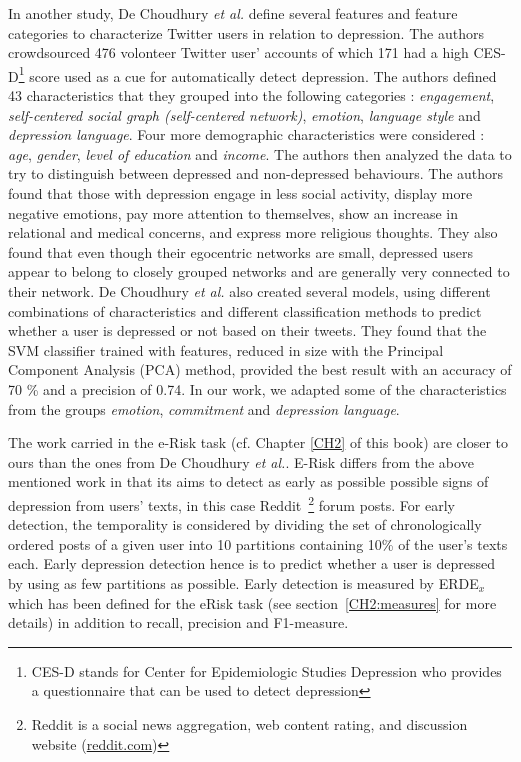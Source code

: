 \documentclass[graybox]{svmult}
\begin{document}
In another study, De Choudhury \textit{et al.} \cite{Choudhury2013} define several features and feature categories  to characterize Twitter users in relation to depression. The authors  crowdsourced 476 volonteer Twitter user' accounts of which 171 had a high CES-D\footnote{CES-D  stands for Center for Epidemiologic Studies Depression who provides a questionnaire that can be used to detect depression} score used as a cue for automatically detect depression. The authors defined 43 characteristics that they grouped into the following categories : \textit{engagement}, \textit{self-centered social graph (self-centered network)}, \textit{emotion}, \textit{language style} and \textit{depression language}. Four more demographic characteristics were considered : \textit{age}, \textit{gender}, \textit{level of education} and \textit{income}. The authors then analyzed the data  to try to distinguish between depressed and non-depressed behaviours. The authors found that those with depression engage in less social activity, display more negative emotions, pay more attention to themselves, show an increase in relational and medical concerns, and express more religious thoughts. They also found that even though their egocentric networks are small, depressed users appear to belong to closely grouped networks and are generally very connected to their network. De Choudhury \textit{et al.} also created several models, using different combinations of characteristics and different classification methods to predict whether a user is depressed or not based on their tweets. They found that the SVM classifier trained with features, reduced in size with the Principal Component Analysis (PCA) method, provided the best result with an accuracy of 70 \% and a precision of 0.74. In our work, we  adapted some of the characteristics from the groups \textit{emotion}, \textit{commitment} and \textit{depression language}.

The work carried in the e-Risk task (cf. Chapter \ref{CH2} of this book) are closer to ours than the ones from De Choudhury \textit{et al.}.  E-Risk differs from the above mentioned work in that its aims to detect as early as possible possible signs of depression  from users' texts, in this case Reddit~\footnote{Reddit is a social news aggregation, web content rating, and discussion website (\url{reddit.com})} forum posts. For early detection, the temporality is considered by dividing the set of chronologically ordered posts of a given user into 10 partitions containing 10\% of the user's texts each. Early depression detection hence is to predict whether a user is  depressed by using as few partitions as possible. Early detection is measured by ERDE$_{x}$ which has been defined  for the eRisk task (see section~\ref{CH2:measures} for more details) in addition to recall, precision and F1-measure.
\end{document}
